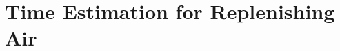 \documentclass[../../main]{subfiles}
\begin{document}
\section{Time Estimation for Replenishing Air} \label{sec:}
\end{document}
